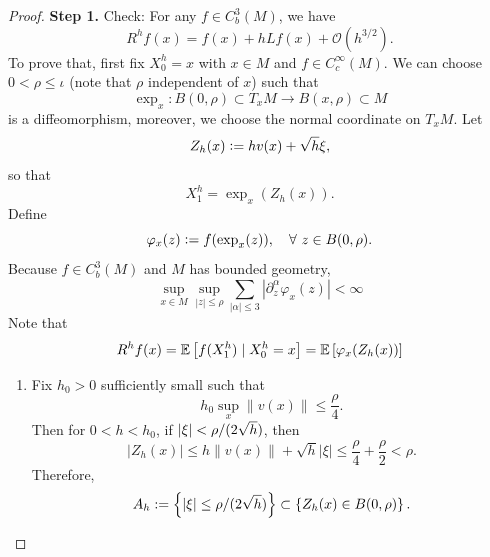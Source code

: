 \begin{proof}
    \vspace{0.5em}
    \textbf{Step 1.} Check: For any $f \in C^3_b(M)$, we have
    \begin{equation*}
        R^hf(x) = f(x) + hLf(x) + \mathcal{O}(h^{3/2}).
    \end{equation*}
    To prove that, first fix $X^h_0 = x$ with $x \in M$ and $f \in C_c^\infty(M)$. We can choose $0 < \rho \leq \iota$ (note that $\rho$ independent of $x$) such that
    \begin{equation*}
        \exp_x \colon B(0,\rho) \subset T_xM \rightarrow B(x,\rho) \subset M
    \end{equation*}
    is a diffeomorphism, moreover, we choose the normal coordinate on $T_xM$. Let
    \begin{equation*}
        Z_h(x) \vcentcolon= hv(x) + \sqrt{h}\xi,
    \end{equation*}
    so that
    \begin{equation*}
        X_1^h = \exp_x(Z_h(x)).
    \end{equation*}
    Define
    \begin{equation*}
        \varphi_x(z) \vcentcolon= f(\exp_x(z)),\quad \forall~ z \in B(0,\rho).
    \end{equation*}
    Because $f \in C_b^3(M)$ and $M$ has bounded geometry, 
    \begin{equation*}
        \sup _{x \in M} \sup _{|z| \leq \rho} \sum_{|\alpha| \leq 3}\left|\partial_z^\alpha \varphi_x(z)\right|<\infty
    \end{equation*}
    Note that
    \begin{equation*}
        R^hf(x) = \mathbb{E}\left[f(X_1^h) \mid X_0^h = x\right] = \mathbb{E}\left[\varphi_x(Z_h(x))\right]
    \end{equation*}
    \begin{enumerate}[label=\Roman{*}.]
        \item Fix $h_0 > 0$ sufficiently small such that
        \begin{equation*}
            h_0 \sup _x\|v(x)\| \leq \frac{\rho}{4}.
        \end{equation*}
        Then for $0 < h < h_0$, if $\left\lvert\xi\right\lvert < {\rho}/{(2 \sqrt{h})}$, then
        \begin{equation*}
            \left|Z_h(x)\right| \leq h\|v(x)\|+\sqrt{h}|\xi| \leq \frac{\rho}{4}+\frac{\rho}{2}<\rho.
        \end{equation*}
        Therefore,
        \begin{equation*}
            A_h:=\left\{|\xi| \leq {\rho}/{(2 \sqrt{h})}\right\} \subset \bb{Z_h(x) \in B(0,\rho)}.

\end{equation*}
\end{enumerate}
\end{proof}
